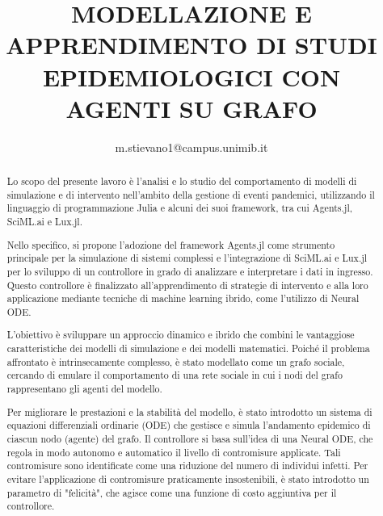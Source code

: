 \documentclass{article}
\title{MODELLAZIONE E APPRENDIMENTO DI STUDI EPIDEMIOLOGICI CON AGENTI SU GRAFO}
\author{m.stievano1@campus.unimib.it}
\begin{document}


\begin{abstract}
    Lo scopo del presente lavoro è l'analisi e lo studio del comportamento 
    di modelli di simulazione e di intervento nell'ambito della gestione 
    di eventi pandemici, utilizzando il linguaggio di programmazione Julia 
    e alcuni dei suoi framework, tra cui Agents.jl, SciML.ai e Lux.jl.

    Nello specifico, si propone l'adozione del framework Agents.jl come 
    strumento principale per la simulazione di sistemi complessi e 
    l'integrazione di SciML.ai e Lux.jl per lo sviluppo di un controllore 
    in grado di analizzare e interpretare i dati in ingresso. 
    Questo controllore è finalizzato all'apprendimento di strategie di 
    intervento e alla loro applicazione mediante tecniche di machine 
    learning ibrido, come l'utilizzo di Neural ODE.
    
    L'obiettivo è sviluppare un approccio dinamico e ibrido che combini 
    le vantaggiose caratteristiche dei modelli di simulazione e dei 
    modelli matematici. Poiché il problema affrontato è intrinsecamente 
    complesso, è stato modellato come un grafo sociale, 
    cercando di emulare il comportamento di una rete sociale in cui i 
    nodi del grafo rappresentano gli agenti del modello.
    
    Per migliorare le prestazioni e la stabilità del modello, è stato 
    introdotto un sistema di equazioni differenziali ordinarie (ODE) 
    che gestisce e simula l'andamento epidemico di ciascun nodo (agente) 
    del grafo. Il controllore si basa sull'idea di una Neural ODE, 
    che regola in modo autonomo e automatico il livello di contromisure 
    applicate. Tali contromisure sono identificate come una riduzione 
    del numero di individui infetti. Per evitare l'applicazione di 
    contromisure praticamente insostenibili, è stato introdotto un 
    parametro di "felicità", che agisce come una funzione di costo 
    aggiuntiva per il controllore.
\end{abstract}


\tableofcontents
\newpage
\listoffigures
\listoftables
\newpage








\end{document}
